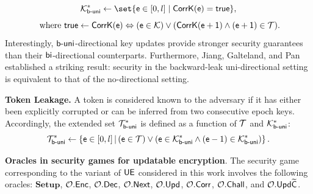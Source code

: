 \documentclass{fundam}
\begin{document}
$$\Set{K}_{\opuni}^{*}\gets \set{\epoch\in [0,l]\mid \tx{CorrK}(\epoch)=\tx{true}},$$ $$ \text{ where } \mathsf{true}\gets\mathsf{CorrK}(\mathsf{e})\Leftrightarrow (\mathsf{e} \in\mathcal{K}) \lor (\mathsf{CorrK(\mathsf{e} +1 )\land (\mathsf{e} +1 )\in \mathcal{T}}).$$
Interestingly, $\mathsf{b}{\text{-}}\mathsf{uni}$-directional key updates provide stronger security guarantees than their $\mathsf{bi}$-directional counterparts. Furthermore, Jiang, Galteland, and Pan~\cite{jiang2023backward} established a striking result: security in the backward-leak uni-directional setting is equivalent to that of the no-directional setting.


\vspace{0.3cm}
\noindent\textbf{Token Leakage.} A token is considered known to the adversary if it has either been explicitly corrupted or can be inferred from two consecutive epoch keys. Accordingly, the extended set $\mathcal{T}_{\mathsf{b}{\text{-}}\mathsf{uni}}^{*}$ is defined as a function of $\mathcal{T}$ and $\mathcal{K}_{\mathsf{b}{\text{-}}\mathsf{uni}}^{*}$:
\[
\mathcal{T}_{\mathsf{b}{\text{-}}\mathsf{uni}}^{*} \gets \left\{ \mathsf{e} \in [0, l] \,\middle|\, (\mathsf{e} \in \mathcal{T}) \lor \left(\mathsf{e} \in \mathcal{K}_{\mathsf{b}{\text{-}}\mathsf{uni}}^{*} \land (\mathsf{e} - 1) \in \mathcal{K}_{\mathsf{b}{\text{-}}\mathsf{uni}}^{*} \right) \right\}.
\]


\vspace{0.3cm}
\noindent\textbf{Oracles in security games for updatable encryption}. The security game corresponding to the variant of $\mathsf{UE}$ considered in this work involves the following oracles: $\mathbf{Setup}$, $\mathcal{O}.\mathsf{Enc}$, $\mathcal{O}.\mathsf{Dec}$, $\mathcal{O}.\mathsf{Next}$, $\mathcal{O}.\mathsf{Upd}$, $\mathcal{O}.\mathsf{Corr}$, $\mathcal{O}.\mathsf{Chall}$, and $\mathcal{O}.\mathsf{Upd}\widetilde{\mathsf{C}}$.

\vspace{0.5cm}
\end{document}
